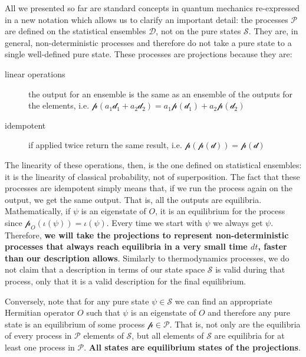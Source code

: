 \documentclass[applsci,article,submit,moreauthors,pdftex]{Definitions/mdpi}
\begin{document}
All we presented so far are standard concepts in quantum mechanics re-expressed in a new notation which allows us to clarify an important detail: the processes $\mathcal{P}$ are defined on the statistical ensembles $\mathcal{D}$, not on the pure states $\mathcal{S}$. They are, in general, non-deterministic processes and therefore do not take a pure state to a single well-defined pure state. These processes are projections because they are:
\begin{description}
	\item [linear operations] the output for an ensemble is the same as an ensemble of the outputs for the elements, i.e. $\mathcal{p}(a_1\mathcal{d}_1 + a_2\mathcal{d}_2) = a_1\mathcal{p}(\mathcal{d}_1) + a_2\mathcal{p}(\mathcal{d}_2)$
	\item [idempotent] if applied twice return the same result, i.e. $\mathcal{p}(\mathcal{p}(\mathcal{d})) = \mathcal{p}(\mathcal{d})$
\end{description}
The linearity of these operations, then, is the one defined on statistical ensembles: it is the linearity of classical probability, not of superposition. The fact that these processes are idempotent simply means that, if we run the process again on the output, we get the same output. That is, all the outputs are equilibria. Mathematically, if $\psi$ is an eigenstate of $O$, it is an equilibrium for the process since $\mathcal{p}_O(\iota(\psi))=\iota(\psi)$. Every time we start with $\psi$ we always get $\psi$. Therefore, \textbf{we will take the projections to represent non-deterministic processes that always reach equilibria in a very small time $dt$, faster than our description allows}. Similarly to thermodynamics processes, we do not claim that a description in terms of our state space $\mathcal{S}$ is valid during that process, only that it is a valid description for the final equilibrium. 

Conversely, note that for any pure state $\psi \in \mathcal{S}$ we can find an appropriate Hermitian operator $O$ such that $\psi$ is an eigenstate of $O$ and therefore any pure state is an equilibrium of some process $\mathcal{p} \in \mathcal{P}$. That is, not only are the equilibria of every process in $\mathcal{P}$ elements of $\mathcal{S}$, but all elements of $\mathcal{S}$ are equilibria for at least one process in $\mathcal{P}$. \textbf{All states are equilibrium states of the projections}.
\end{document}
